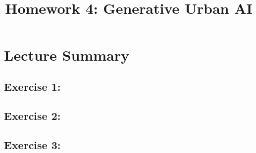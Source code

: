 \documentclass[11pt]{article}
\title{Homework 4: Generative Urban AI}
\begin{document}
\maketitle

\section*{Lecture Summary}


\subsection*{Exercise 1: }


\subsection*{Exercise 2: }


\subsection*{Exercise 3: }
\end{document}
